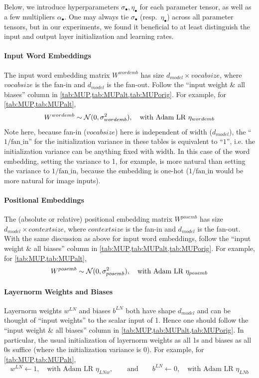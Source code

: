 \documentclass{article}
\theoremstyle{definition}
\newcommand{\fanin}{\mathrm{fan\_in}}
\begin{document}
Below, we introduce hyperparameters $\sigma_\bullet, \eta_\bullet$ for each parameter tensor, as well as a few multipliers $\alpha_\bullet$.
One may always tie $\sigma_\bullet$ (resp.\ $\eta_\bullet$) across all parameter tensors, but in our experiments, we found it beneficial to at least distinguish the input and output layer initialization and learning rates.

\paragraph{Input Word Embeddings}
The input word embedding matrix $W^{wordemb}$ has size $d_{model} \times vocabsize$, where $vocabsize$ is the fan-in and $d_{model}$ is the fan-out.
Follow the ``input weight \& all biases'' column in \cref{tab:MUP,tab:MUPalt,tab:MUPorig}.
For example, for \cref{tab:MUP,tab:MUPalt},
\[
  W^{wordemb} \sim \mathcal{N}(0, \sigma^2_{wordemb}),\quad\text{with Adam LR }\eta_{wordemb}\]
Note here, because fan-in ($vocabsize$) here is independent of width ($d_{model}$), the ``$1/\fanin$'' for the initialization variance in these tables is equivalent to ``$1$'', i.e. the initialization variance can be anything fixed with width.
In this case of the word embedding, setting the variance to 1, for example, is more natural than setting the variance to $1/\fanin$, because the embedding is one-hot ($1/\fanin$ would be more natural for image inputs).

\paragraph{Positional Embeddings}
The (absolute or relative) positional embedding matrix $W^{posemb}$ has size $d_{model} \times contextsize$, where $contextsize$ is the fan-in and $d_{model}$ is the fan-out.
With the same discussion as above for input word embeddings, follow the ``input weight \& all biases'' column in \cref{tab:MUP,tab:MUPalt,tab:MUPorig}.
For example, for \cref{tab:MUP,tab:MUPalt},
\[
  W^{posemb} \sim \mathcal{N}(0, \sigma^2_{posemb}),\quad\text{with Adam LR }\eta_{posemb}\]

\paragraph{Layernorm Weights and Biases}
Layernorm weights $w^{LN}$ and biases $b^{LN}$ both have shape $d_{model}$ and can be thought of ``input weights'' to the scalar input of 1.
Hence one should follow the ``input weight \& all biases'' column in \cref{tab:MUP,tab:MUPalt,tab:MUPorig}.
In particular, the usual initialization of layernorm weights as all 1s and biases as all 0s suffice (where the initialization variance is 0).
For example, for \cref{tab:MUP,tab:MUPalt},
\[
  w^{LN} \gets 1,\quad\text{with Adam LR }\eta_{LNw},\qquad \text{and} \qquad
  b^{LN} \gets 0,\quad\text{with Adam LR }\eta_{LNb}\]
\end{document}
